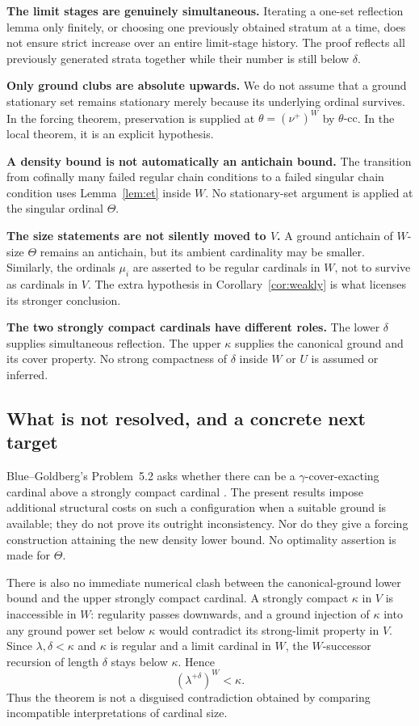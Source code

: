 \documentclass[11pt,letterpaper]{article}
\theoremstyle{definition}
\numberwithin{equation}{section}
\newcommand{\cc}{\text{-cc}}
\begin{document}
\textbf{The limit stages are genuinely simultaneous.}
Iterating a one-set reflection lemma only finitely, or choosing one previously obtained stratum at a time, does not ensure strict increase over an entire limit-stage history. The proof reflects all previously generated strata together while their number is still below $\delta$.

\textbf{Only ground clubs are absolute upwards.}
We do not assume that a ground stationary set remains stationary merely because its underlying ordinal survives. In the forcing theorem, preservation is supplied at $\theta=(\nu^+)^W$ by $\theta\cc$. In the local theorem, it is an explicit hypothesis.

\textbf{A density bound is not automatically an antichain bound.}
The transition from cofinally many failed regular chain conditions to a failed singular chain condition uses Lemma~\ref{lem:et} inside $W$. No stationary-set argument is applied at the singular ordinal $\Theta$.

\textbf{The size statements are not silently moved to $V$.}
A ground antichain of $W$-size $\Theta$ remains an antichain, but its ambient cardinality may be smaller. Similarly, the ordinals $\mu_i$ are asserted to be regular cardinals in $W$, not to survive as cardinals in $V$. The extra hypothesis in Corollary~\ref{cor:weakly} is what licenses its stronger conclusion.

\textbf{The two strongly compact cardinals have different roles.}
The lower $\delta$ supplies simultaneous reflection. The upper $\kappa$ supplies the canonical ground and its cover property. No strong compactness of $\delta$ inside $W$ or $U$ is assumed or inferred.

\clearpage
\subsection{What is not resolved, and a concrete next target}

Blue--Goldberg's Problem~5.2 asks whether there can be a $\gamma$-cover-exacting cardinal above a strongly compact cardinal \cite{cover}. The present results impose additional structural costs on such a configuration when a suitable ground is available; they do not prove its outright inconsistency. Nor do they give a forcing construction attaining the new density lower bound. No optimality assertion is made for $\Theta$.

There is also no immediate numerical clash between the canonical-ground lower bound and the upper strongly compact cardinal. A strongly compact $\kappa$ in $V$ is inaccessible in $W$: regularity passes downwards, and a ground injection of $\kappa$ into any ground power set below $\kappa$ would contradict its strong-limit property in $V$. Since $\lambda,\delta<\kappa$ and $\kappa$ is regular and a limit cardinal in $W$, the $W$-successor recursion of length $\delta$ stays below $\kappa$. Hence
\[
(\lambda^{+\delta})^W<\kappa.
\]
Thus the theorem is not a disguised contradiction obtained by comparing incompatible interpretations of cardinal size.
\end{document}
